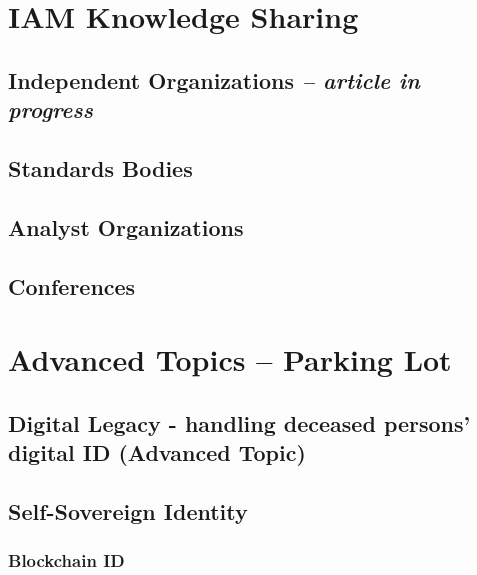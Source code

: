 \hypertarget{iam-knowledge-sharing}{%
\chapter{IAM Knowledge Sharing}\label{iam-knowledge-sharing}}

\hypertarget{independent-organizations-article-in-progress}{%
\section{\texorpdfstring{Independent Organizations \emph{-- article
in
progress}}{Independent Organizations -- article in progress}}\label{independent-organizations-article-in-progress}}

\hypertarget{standards-bodies}{%
\section{Standards Bodies}\label{standards-bodies}}

\hypertarget{analyst-organizations}{%
\section{Analyst Organizations}\label{analyst-organizations}}

\hypertarget{conferences}{%
\section{Conferences}\label{conferences}}

\hypertarget{advanced-topics-parking-lot}{%
\chapter{Advanced Topics -- Parking
Lot}\label{advanced-topics-parking-lot}}

\hypertarget{digital-legacy---handling-deceased-persons-digital-id-advanced-topic}{%
\section{Digital Legacy - handling deceased persons' digital ID
(Advanced
Topic)}\label{digital-legacy---handling-deceased-persons-digital-id-advanced-topic}}

\hypertarget{self-sovereign-identity}{%
\section{Self-Sovereign Identity}\label{self-sovereign-identity}}

\hypertarget{blockchain-id}{%
\subsection{Blockchain ID}\label{blockchain-id}}
